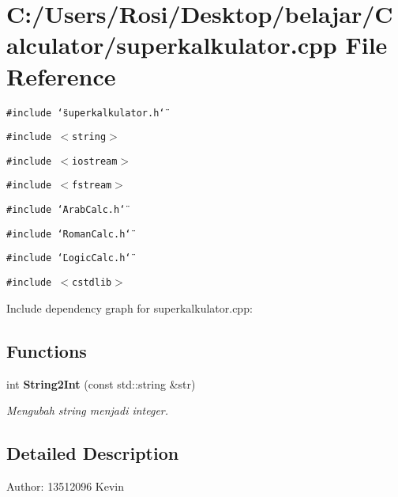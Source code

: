 \section{C:/Users/Rosi/Desktop/belajar/Calculator/superkalkulator.cpp File Reference}
\label{superkalkulator_8cpp}
{\tt \#include \char`\"{}superkalkulator.h\char`\"{}}\par
{\tt \#include $<$string$>$}\par
{\tt \#include $<$iostream$>$}\par
{\tt \#include $<$fstream$>$}\par
{\tt \#include \char`\"{}Arab\-Calc.h\char`\"{}}\par
{\tt \#include \char`\"{}Roman\-Calc.h\char`\"{}}\par
{\tt \#include \char`\"{}Logic\-Calc.h\char`\"{}}\par
{\tt \#include $<$cstdlib$>$}\par


Include dependency graph for superkalkulator.cpp:\subsection*{Functions}
\begin{CompactItemize}
\item 
int {\bf String2Int} (const std::string \&str)\label{superkalkulator_8cpp_4e641ae577d3199df1f75dde81656047}

\begin{CompactList}\small\item\em Mengubah string menjadi integer. \item\end{CompactList}\end{CompactItemize}


\subsection{Detailed Description}
\begin{Desc}
\item[Author:]13512096 Kevin \end{Desc}
